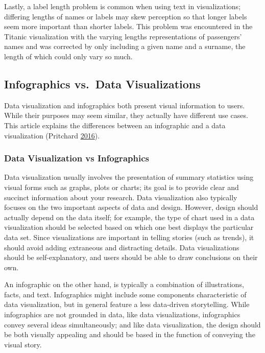 \documentclass[]{book}
\theoremstyle{definition}
\theoremstyle{definition}
\theoremstyle{definition}
\theoremstyle{remark}
\begin{document}
Lastly, a label length problem is common when using text in
visualizations; differing lengths of names or labels may skew perception
so that longer labels seem more important than shorter labels. This
problem was encountered in the Titanic visualization with the varying
lengths representations of passengers' names and was corrected by only
including a given name and a surname, the length of which could only
vary so much.

\subsection{Infographics vs.~Data
Visualizations}\label{infographics-vs.data-visualizations-1}

Data visualization and infographics both present visual information to
users. While their purposes may seem similar, they actually have
different use cases. This article explains the differences between an
infographic and a data visualization (Pritchard
\protect\hyperlink{ref-VIZVSINFO}{2016}).

\subsubsection{Data Visualization vs
Infographics}\label{data-visualization-vs-infographics}

Data visualization usually involves the presentation of summary
statistics using visual forms such as graphs, plots or charts; its goal
is to provide clear and succinct information about your research. Data
visualization also typically focuses on the two important aspects of
data and design. However, design should actually depend on the data
itself; for example, the type of chart used in a data visualization
should be selected based on which one best displays the particular data
set. Since visualizations are important in telling stories (such as
trends), it should avoid adding extraneous and distracting details. Data
visualizations should be self-explanatory, and users should be able to
draw conclusions on their own.

An infographic on the other hand, is typically a combination of
illustrations, facts, and text. Infographics might include some
components characteristic of data visualization, but in general feature
a less data-driven storytelling. While infographics are not grounded in
data, like data visualizations, infographics convey several ideas
simultaneously; and like data visualization, the design should be both
visually appealing and should be based in the function of conveying the
visual story.
\end{document}
